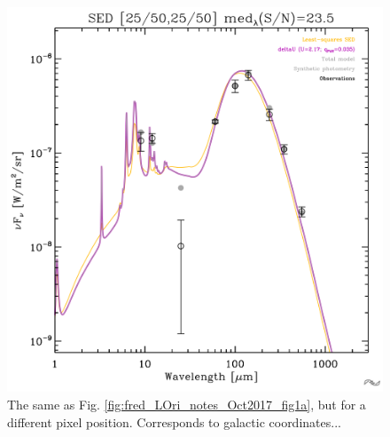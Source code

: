     \begin{figure}
      \includegraphics[width=\textwidth/2]{../Plots/ch_lori/fred_LOri_notes_Oct2017_fig1b.pdf}
      \centering
      \caption{The same as Fig. \ref{fig:fred_LOri_notes_Oct2017_fig1a}, but for a different pixel position. Corresponds to galactic coordinates...}
      \label{fig:fred_LOri_notes_Oct2017_fig1b}
    \end{figure}

